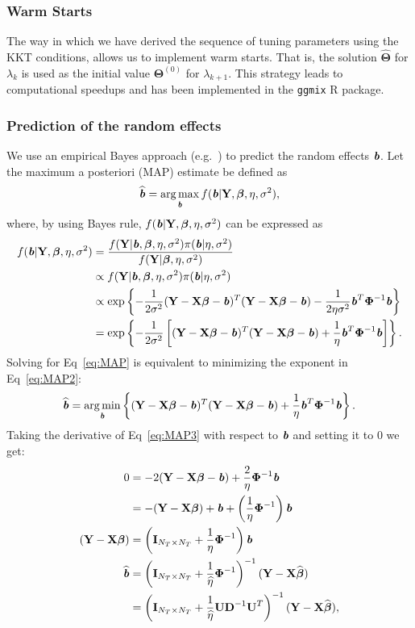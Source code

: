 \documentclass[10pt,letterpaper]{article}
\newcommand{\bX}{\textbf{X}}
\newcommand{\bY}{\textbf{Y}}
\newcommand{\bD}{\textbf{D}}
\newcommand{\bU}{\textbf{U}}
\newcommand{\bb}{\textbf{\emph{b}}}
\newcommand{\bI}{\textbf{I}}
\newcommand{\bTheta}{\boldsymbol{\Theta}}
\newcommand{\bbeta}{\boldsymbol{\beta}}
\newcommand{\bPhi}{\boldsymbol{\Phi}}
\DeclareMathOperator*{\argmin}{arg\,min}
\DeclareMathOperator*{\argmax}{arg\,max}
\begin{document}
\subsubsection*{Warm Starts}
The way in which we have derived the sequence of tuning parameters using the KKT conditions, allows us to implement warm starts. That is, the solution $\widehat{\bTheta}$ for $\lambda_k$ is used as the initial value $\bTheta^{(0)}$ for $\lambda_{k+1}$. This strategy leads to computational speedups and has been implemented in the \texttt{ggmix} R package.


\subsubsection*{Prediction of the random effects}
We use an empirical Bayes approach (e.g.~\cite{wakefield2013bayesian}) to predict the random effects $\bb$. Let the maximum a posteriori (MAP) estimate be defined as
\begin{equation}
\widehat{\bb} = \argmax_{\bb} f(\bb |  \bY, \bbeta, \eta, \sigma^2)  \label{eq:MAP},
\end{equation}
where, by using Bayes rule, $f(\bb |  \bY, \bbeta, \eta, \sigma^2)$ can be expressed as
\begin{align}
f(\bb |  \bY, \bbeta, \eta, \sigma^2) & = \frac{f(\bY | \bb,  \bbeta, \eta, \sigma^2)  \pi(\bb | \eta, \sigma^2)}{f(\bY |  \bbeta, \eta, \sigma^2)} \nonumber \\
& \propto f(\bY | \bb,  \bbeta, \eta, \sigma^2)  \pi(\bb | \eta, \sigma^2) \nonumber\\
& \propto \exp \left\lbrace - \frac{1}{2 \sigma^2} (\bY - \bX \bbeta - \bb)^T  (\bY - \bX \bbeta - \bb) - \frac{1}{2\eta \sigma^2}\bb^T \bPhi^{-1}\bb   \right \rbrace \nonumber\\
& = \exp \left\lbrace - \frac{1}{2 \sigma^2} \left[  (\bY - \bX \bbeta - \bb)^T (\bY - \bX \bbeta - \bb) + \frac{1}{\eta }\bb^T \bPhi^{-1}\bb \right]    \right \rbrace \label{eq:MAP2}.
\end{align}
Solving for Eq~\ref{eq:MAP} is equivalent to minimizing the exponent in Eq~\ref{eq:MAP2}:
\begin{align}
\widehat{\bb} = \argmin_{\bb} \left\lbrace (\bY - \bX \bbeta - \bb)^T  (\bY - \bX \bbeta - \bb) + \frac{1}{\eta }\bb^T \bPhi^{-1}\bb  \right\rbrace \label{eq:MAP3}.
\end{align}
Taking the derivative of Eq~\ref{eq:MAP3} with respect to $\bb$ and setting it to 0 we get:
\begin{align}
0 & = -2  (\bY - \bX \bbeta - \bb) + \frac{2}{\eta} \bPhi^{-1}\bb \nonumber \\
& = - (\bY - \bX \bbeta ) + \bb +  \left( \frac{1}{\eta}\bPhi^{-1}\right) \bb  \nonumber\\
(\bY - \bX \bbeta ) & = \left(\bI_{N_T \times N_T} +  \frac{1}{\eta}\bPhi^{-1}\right) \bb  \nonumber\\
\widehat{\bb} & = \left( \bI_{N_T \times N_T} +  \frac{1}{\widehat{\eta}}\bPhi^{-1}\right)^{-1}  (\bY - \bX \widehat{\bbeta} ) \nonumber \\
& = \left( \bI_{N_T \times N_T} +  \frac{1}{\widehat{\eta}} \bU \bD^{-1} \bU^T\right)^{-1}  (\bY - \bX \widehat{\bbeta} ) \nonumber,
\end{align}
\end{document}

